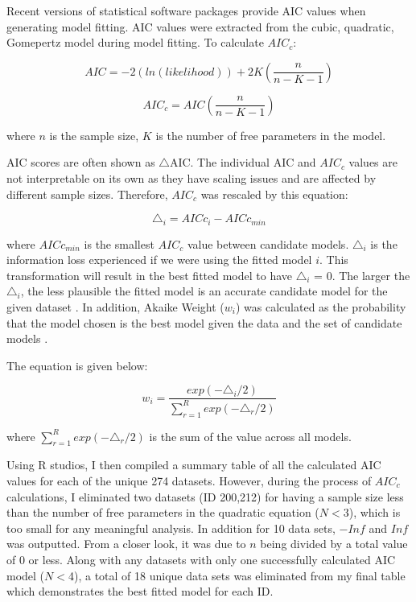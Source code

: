 \documentclass[11pt]{article}
\begin{document}
Recent versions of statistical software packages provide AIC values when generating model fitting. AIC values were extracted 
from the cubic, quadratic, Gomepertz model during model fitting. To calculate $AIC_{c}$: 

    \begin{equation}    
    AIC = -2(ln(likelihood))+2K(\frac{n}{n-K-1})
    \end{equation}

    \begin{equation}    
    AIC_{c}= AIC(\frac{n}{n-K-1})
    \end{equation}

\noindent where $n$ is the sample size, $K$ is the number of free parameters in the model.

AIC scores are often shown as $\triangle$AIC. The individual AIC and $AIC_{c}$ values are not interpretable on its own as they have scaling 
issues and are affected by different sample sizes. Therefore, $AIC_{c}$ was rescaled by this equation: 

    \begin{equation}    
    \triangle_{i}= AICc_{i} - AICc_{min}
    \end{equation}

\noindent where $AICc_{min}$ is the smallest $AIC_{c}$ value between candidate models. $\triangle_{i}$ is the information loss experienced if we were 
using the fitted model $i$. This transformation will result in the best fitted model to have $\triangle_{i}$ = 0. The larger the $\triangle_{i}$, the less 
plausible the fitted model is an accurate candidate model for the given dataset \cite{burnham_multimodel_2004}. In addition, Akaike Weight ($w_{i}$) was calculated as 
the probability that the model chosen is the best model given the data and the set of candidate models \cite{wagenmakers_aic_2004}.

The equation is given below:

    \begin{equation}    
    w_{i}= \frac{exp(-\triangle_{i}/2)}{\sum_{r=1}^{R}exp(-\triangle_{r}/2)}
    \end{equation}

\noindent where $\sum_{r=1}^{R}exp(-\triangle_{r}/2)$ is the sum of the value across all models.  

Using R studios, I then compiled a summary table of all the calculated AIC values for each of the unique 274 datasets. 
However, during the process of $AIC_{c}$ calculations, I eliminated two datasets (ID 200,212) for having a sample size 
less than the number of free parameters in the quadratic equation ($N<$3), which is too small for any meaningful analysis. 
In addition for 10 data sets, $-Inf$ and $Inf$ was outputted. From a closer look, it was due to $n$ being divided by a total value 
of 0 or less. Along with any datasets with only one successfully calculated AIC model ($N<$4), a total of 18 unique data 
sets was eliminated from my final table which demonstrates the best fitted model for each ID. 
\end{document}
